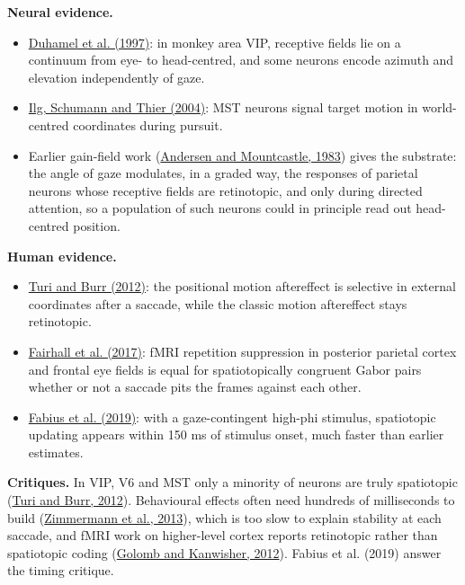 \documentclass[11pt,a4paper]{article}
\begin{document}
\textbf{Neural evidence.}

\begin{itemize}[itemsep=2pt,topsep=2pt]
\item \href{https://www.nature.com/articles/39865}{Duhamel et al. (1997)}: in monkey area VIP, receptive fields lie on a continuum from eye- to head-centred, and some neurons encode azimuth and elevation independently of gaze.
\item \href{https://www.sciencedirect.com/science/article/pii/S0896627304003319}{Ilg, Schumann and Thier (2004)}: MST neurons signal target motion in world-centred coordinates during pursuit.
\item Earlier gain-field work (\href{https://doi.org/10.1523/JNEUROSCI.03-03-00532.1983}{Andersen and Mountcastle, 1983}) gives the substrate: the angle of gaze modulates, in a graded way, the responses of parietal neurons whose receptive fields are retinotopic, and only during directed attention, so a population of such neurons could in principle read out head-centred position.
\end{itemize}

\textbf{Human evidence.}

\begin{itemize}[itemsep=2pt,topsep=2pt]
\item \href{https://royalsocietypublishing.org/doi/10.1098/rspb.2012.0637}{Turi and Burr (2012)}: the positional motion aftereffect is selective in external coordinates after a saccade, while the classic motion aftereffect stays retinotopic.
\item \href{https://www.sciencedirect.com/science/article/pii/S1053811916306899}{Fairhall et al. (2017)}: fMRI repetition suppression in posterior parietal cortex and frontal eye fields is equal for spatiotopically congruent Gabor pairs whether or not a saccade pits the frames against each other.
\item \href{https://www.pnas.org/doi/10.1073/pnas.1812210116}{Fabius et al. (2019)}: with a gaze-contingent high-phi stimulus, spatiotopic updating appears within 150 ms of stimulus onset, much faster than earlier estimates.
\end{itemize}

\textbf{Critiques.} In VIP, V6 and MST only a minority of neurons are truly spatiotopic (\href{https://royalsocietypublishing.org/doi/10.1098/rspb.2012.0637}{Turi and Burr, 2012}). Behavioural effects often need hundreds of milliseconds to build (\href{https://doi.org/10.1016/j.cub.2013.01.065}{Zimmermann et al., 2013}), which is too slow to explain stability at each saccade, and fMRI work on higher-level cortex reports retinotopic rather than spatiotopic coding (\href{https://doi.org/10.1093/cercor/bhr357}{Golomb and Kanwisher, 2012}). Fabius et al. (2019) answer the timing critique.
\end{document}
